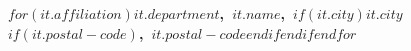 \textbf{$for(it.affiliation)$$it.department$,\ $it.name$,\ $if(it.city)$$it.city$$if(it.postal-code)$,\ $it.postal-code$$endif$$endif$$endfor$}
